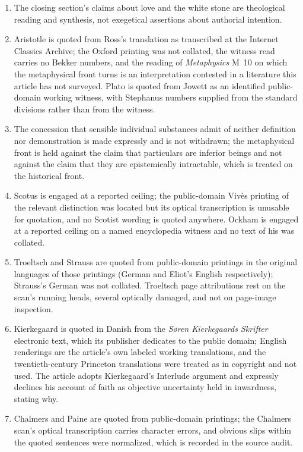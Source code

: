 \begin{enumerate}
\item The closing section's claims about love and the white stone are theological reading and synthesis, not exegetical assertions about authorial intention.
\item Aristotle is quoted from Ross's translation as transcribed at the Internet Classics Archive; the Oxford printing was not collated, the witness read carries no Bekker numbers, and the reading of \emph{Metaphysics} M~10 on which the metaphysical front turns is an interpretation contested in a literature this article has not surveyed. Plato is quoted from Jowett as an identified public-domain working witness, with Stephanus numbers supplied from the standard divisions rather than from the witness.
\item The concession that sensible individual substances admit of neither definition nor demonstration is made expressly and is not withdrawn; the metaphysical front is held against the claim that particulars are inferior beings and not against the claim that they are epistemically intractable, which is treated on the historical front.
\item Scotus is engaged at a reported ceiling; the public-domain Vivès printing of the relevant distinction was located but its optical transcription is unusable for quotation, and no Scotist wording is quoted anywhere. Ockham is engaged at a reported ceiling on a named encyclopedia witness and no text of his was collated.
\item Troeltsch and Strauss are quoted from public-domain printings in the original languages of those printings (German and Eliot's English respectively); Strauss's German was not collated. Troeltsch page attributions rest on the scan's running heads, several optically damaged, and not on page-image inspection.
\item Kierkegaard is quoted in Danish from the \emph{S\o ren Kierkegaards Skrifter} electronic text, which its publisher dedicates to the public domain; English renderings are the article's own labeled working translations, and the twentieth-century Princeton translations were treated as in copyright and not used. The article adopts Kierkegaard's Interlude argument and expressly declines his account of faith as objective uncertainty held in inwardness, stating why.
\item Chalmers and Paine are quoted from public-domain printings; the Chalmers scan's optical transcription carries character errors, and obvious slips within the quoted sentences were normalized, which is recorded in the source audit.

\end{enumerate}
